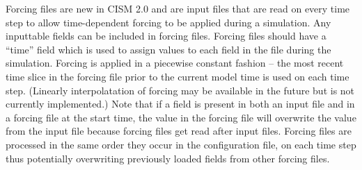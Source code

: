 Forcing files are new in CISM 2.0 and are input files that are read on every 
time step to allow time-dependent
forcing to be applied during a simulation.  Any inputtable fields can be included
in forcing files.  Forcing files should have a ``time'' field which is used to 
assign values to each field in the file during the simulation.  Forcing is applied 
in a piecewise constant fashion -- the most recent time slice in the forcing file prior
to the current model time is used on each time step.  (Linearly interpolatation of
forcing may be available in the future but is not currently implemented.)
Note that if a field is present in both an input file and in a
forcing file at the start time, the value in the forcing file will overwrite the value
from the input file because forcing files get read after input files.
Forcing files are processed in the same order they occur in the configuration file, 
on each time step thus potentially overwriting previously loaded fields from other
forcing files.

